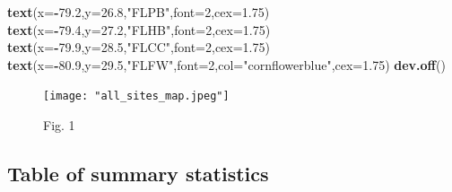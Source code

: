 \documentclass[]{article}
\newenvironment{Shaded}{\begin{snugshade}}{\end{snugshade}}
\newcommand{\KeywordTok}[1]{\textcolor[rgb]{0.13,0.29,0.53}{\textbf{#1}}}
\newcommand{\DataTypeTok}[1]{\textcolor[rgb]{0.13,0.29,0.53}{#1}}
\newcommand{\DecValTok}[1]{\textcolor[rgb]{0.00,0.00,0.81}{#1}}
\newcommand{\FloatTok}[1]{\textcolor[rgb]{0.00,0.00,0.81}{#1}}
\newcommand{\StringTok}[1]{\textcolor[rgb]{0.31,0.60,0.02}{#1}}
\newcommand{\OperatorTok}[1]{\textcolor[rgb]{0.81,0.36,0.00}{\textbf{#1}}}
\newcommand{\NormalTok}[1]{#1}
\begin{document}
\begin{Shaded}
\begin{Highlighting}[]
\KeywordTok{text}\NormalTok{(}\DataTypeTok{x=}\OperatorTok{-}\FloatTok{79.2}\NormalTok{,}\DataTypeTok{y=}\FloatTok{26.8}\NormalTok{,}\StringTok{"FLPB"}\NormalTok{,}\DataTypeTok{font=}\DecValTok{2}\NormalTok{,}\DataTypeTok{cex=}\FloatTok{1.75}\NormalTok{)}
\KeywordTok{text}\NormalTok{(}\DataTypeTok{x=}\OperatorTok{-}\FloatTok{79.4}\NormalTok{,}\DataTypeTok{y=}\FloatTok{27.2}\NormalTok{,}\StringTok{"FLHB"}\NormalTok{,}\DataTypeTok{font=}\DecValTok{2}\NormalTok{,}\DataTypeTok{cex=}\FloatTok{1.75}\NormalTok{)}
\KeywordTok{text}\NormalTok{(}\DataTypeTok{x=}\OperatorTok{-}\FloatTok{79.9}\NormalTok{,}\DataTypeTok{y=}\FloatTok{28.5}\NormalTok{,}\StringTok{"FLCC"}\NormalTok{,}\DataTypeTok{font=}\DecValTok{2}\NormalTok{,}\DataTypeTok{cex=}\FloatTok{1.75}\NormalTok{)}
\KeywordTok{text}\NormalTok{(}\DataTypeTok{x=}\OperatorTok{-}\FloatTok{80.9}\NormalTok{,}\DataTypeTok{y=}\FloatTok{29.5}\NormalTok{,}\StringTok{"FLFW"}\NormalTok{,}\DataTypeTok{font=}\DecValTok{2}\NormalTok{,}\DataTypeTok{col=}\StringTok{"cornflowerblue"}\NormalTok{,}\DataTypeTok{cex=}\FloatTok{1.75}\NormalTok{)}
\KeywordTok{dev.off}\NormalTok{()}
\end{Highlighting}
\end{Shaded}

\begin{figure}
\centering
\texttt{[image: "all\_sites\_map.jpeg"]}
\caption{Fig. 1}
\end{figure}

\subsection{Table of summary
statistics}\label{table-of-summary-statistics}
\end{document}
